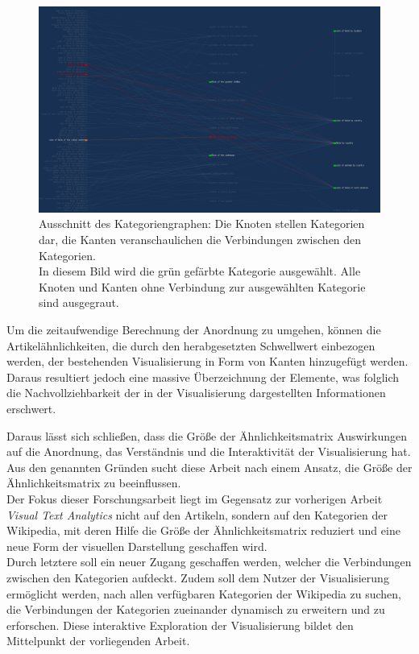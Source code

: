 \begin{figure}[H]
    \centering
    \includegraphics[width=\textwidth]{images/category-view}
    \caption{Ausschnitt des Kategoriengraphen: Die Knoten stellen Kategorien dar, die Kanten veranschaulichen die Verbindungen zwischen den Kategorien.\\ In diesem Bild wird die grün gefärbte Kategorie ausgewählt. Alle Knoten und Kanten ohne Verbindung zur ausgewählten Kategorie sind ausgegraut.}
    \label{fig:category-view}
\end{figure}

Um die zeitaufwendige Berechnung der Anordnung zu umgehen, können die Artikelähnlichkeiten, die durch den herabgesetzten Schwellwert einbezogen werden, der bestehenden Visualisierung in Form von Kanten hinzugefügt werden. 
Daraus resultiert jedoch eine massive Überzeichnung der Elemente, was folglich die Nachvollziehbarkeit der in der Visualisierung dargestellten Informationen erschwert.

Daraus lässt sich schließen, dass die Größe der Ähnlichkeitsmatrix Auswirkungen auf die Anordnung, das Verständnis und die Interaktivität der Visualisierung hat.
Aus den genannten Gründen sucht diese Arbeit nach einem Ansatz, die Größe der Ähnlichkeitsmatrix zu beeinflussen.\\
Der Fokus dieser Forschungsarbeit liegt im Gegensatz zur vorherigen Arbeit \emph{Visual Text Analytics} nicht auf den Artikeln, sondern auf den Kategorien der Wikipedia, mit deren Hilfe die Größe der Ähnlichkeitsmatrix reduziert und eine neue Form der visuellen Darstellung geschaffen wird.\\
Durch letztere soll ein neuer Zugang geschaffen werden, welcher die Verbindungen zwischen den Kategorien aufdeckt.
Zudem soll dem Nutzer der Visualisierung ermöglicht werden, nach allen verfügbaren Kategorien der Wikipedia zu suchen, die Verbindungen der Kategorien zueinander dynamisch zu erweitern und zu erforschen.
Diese interaktive Exploration der Visualisierung bildet den Mittelpunkt der vorliegenden Arbeit.



